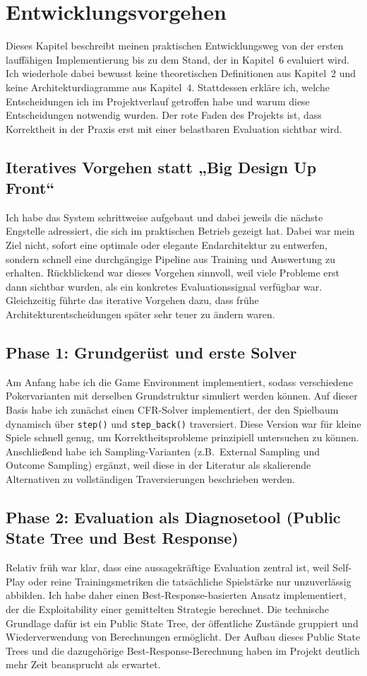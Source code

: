 \section{Entwicklungsvorgehen}

Dieses Kapitel beschreibt meinen praktischen Entwicklungsweg von der ersten lauffähigen Implementierung bis zu dem Stand, der in Kapitel~6 evaluiert wird.
Ich wiederhole dabei bewusst keine theoretischen Definitionen aus Kapitel~2 und keine Architekturdiagramme aus Kapitel~4.
Stattdessen erkläre ich, welche Entscheidungen ich im Projektverlauf getroffen habe und warum diese Entscheidungen notwendig wurden.
Der rote Faden des Projekts ist, dass Korrektheit in der Praxis erst mit einer belastbaren Evaluation sichtbar wird.

\subsection{Iteratives Vorgehen statt „Big Design Up Front“}
Ich habe das System schrittweise aufgebaut und dabei jeweils die nächste Engstelle adressiert, die sich im praktischen Betrieb gezeigt hat.
Dabei war mein Ziel nicht, sofort eine optimale oder elegante Endarchitektur zu entwerfen, sondern schnell eine durchgängige Pipeline aus Training und Auswertung zu erhalten.
Rückblickend war dieses Vorgehen sinnvoll, weil viele Probleme erst dann sichtbar wurden, als ein konkretes Evaluationssignal verfügbar war.
Gleichzeitig führte das iterative Vorgehen dazu, dass frühe Architekturentscheidungen später sehr teuer zu ändern waren.

\subsection{Phase 1: Grundgerüst und erste Solver}
Am Anfang habe ich die Game Environment implementiert, sodass verschiedene Pokervarianten mit derselben Grundstruktur simuliert werden können.
Auf dieser Basis habe ich zunächst einen CFR-Solver implementiert, der den Spielbaum dynamisch über \texttt{step()} und \texttt{step\_back()} traversiert.
Diese Version war für kleine Spiele schnell genug, um Korrektheitsprobleme prinzipiell untersuchen zu können.
Anschließend habe ich Sampling-Varianten (z.B.\ External Sampling und Outcome Sampling) ergänzt, weil diese in der Literatur als skalierende Alternativen zu vollständigen Traversierungen beschrieben werden.

\subsection{Phase 2: Evaluation als Diagnosetool (Public State Tree und Best Response)}
Relativ früh war klar, dass eine aussagekräftige Evaluation zentral ist, weil Self-Play oder reine Trainingsmetriken die tatsächliche Spielstärke nur unzuverlässig abbilden.
Ich habe daher einen Best-Response-basierten Ansatz implementiert, der die Exploitability einer gemittelten Strategie berechnet.
Die technische Grundlage dafür ist ein Public State Tree, der öffentliche Zustände gruppiert und Wiederverwendung von Berechnungen ermöglicht.
Der Aufbau dieses Public State Trees und die dazugehörige Best-Response-Berechnung haben im Projekt deutlich mehr Zeit beansprucht als erwartet.

